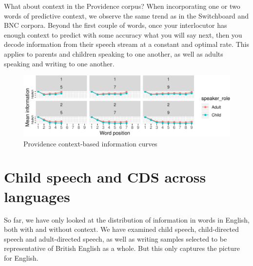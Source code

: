 \documentclass[11pt,]{article}
\begin{document}
What about context in the Providence corpus? When incorporating one or two words of predictive context, we observe the same trend as in the Switchboard and BNC corpora. Beyond the first couple of words, once your interlocutor has enough context to predict with some accuracy what you will say next, then you decode information from their speech stream at a constant and optimal rate. This applies to parents and children speaking to one another, as well as adults speaking and writing to one another.

\begin{figure}
\centering
\includegraphics{paper_files/figure-latex/unnamed-chunk-2-1.pdf}
\caption{\label{fig:unnamed-chunk-2}Providence context-based information curves}
\end{figure}

\hypertarget{child-speech-and-cds-across-languages}{%
\section{Child speech and CDS across languages}\label{child-speech-and-cds-across-languages}}

So far, we have only looked at the distribution of information in words in English, both with and without context. We have examined child speech, child-directed speech and adult-directed speech, as well as writing samples selected to be representative of British English as a whole. But this only captures the picture for English.
\end{document}

